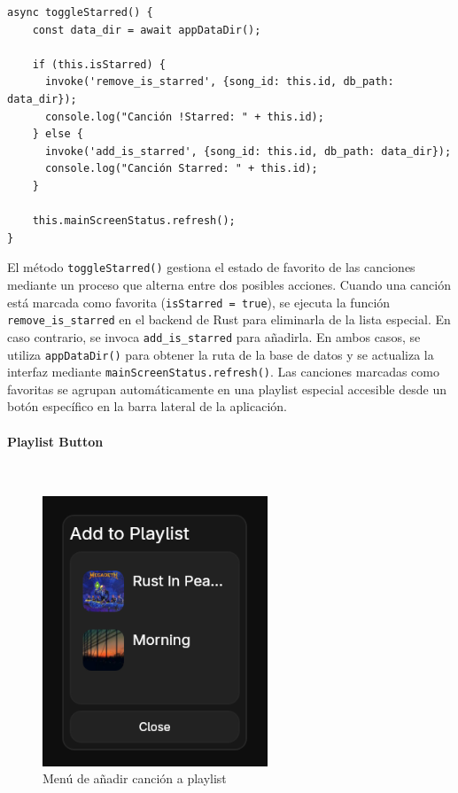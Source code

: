 \documentclass[11pt, a4paper]{article}
\begin{document}
                \begin{lstlisting}[caption={toggleStarred()}]
async toggleStarred() {
    const data_dir = await appDataDir();
    
    if (this.isStarred) {
      invoke('remove_is_starred', {song_id: this.id, db_path: data_dir});
      console.log("Canción !Starred: " + this.id);
    } else {
      invoke('add_is_starred', {song_id: this.id, db_path: data_dir});
      console.log("Canción Starred: " + this.id);
    }

    this.mainScreenStatus.refresh();
}
                \end{lstlisting}

                El método \texttt{toggleStarred()} gestiona el estado de favorito de las canciones mediante un proceso que alterna entre dos posibles acciones. Cuando una canción está marcada como favorita (\texttt{isStarred = true}), se ejecuta la función \texttt{remove\_is\_starred} en el backend de Rust para eliminarla de la lista especial. En caso contrario, se invoca \texttt{add\_is\_starred} para añadirla. En ambos casos, se utiliza \texttt{appDataDir()} para obtener la ruta de la base de datos y se actualiza la interfaz mediante \texttt{mainScreenStatus.refresh()}. Las canciones marcadas como favoritas se agrupan automáticamente en una playlist especial accesible desde un botón específico en la barra lateral de la aplicación. \\

                \paragraph{Playlist Button}
                ‎

                \begin{figure}[H]
                    \centering
                    \includegraphics[width=0.6\textwidth]{media/screenshots/playlistbutton.png}
                    \caption{Menú de añadir canción a playlist}
                    \label{fig:añadir}
                \end{figure}
\end{document}
